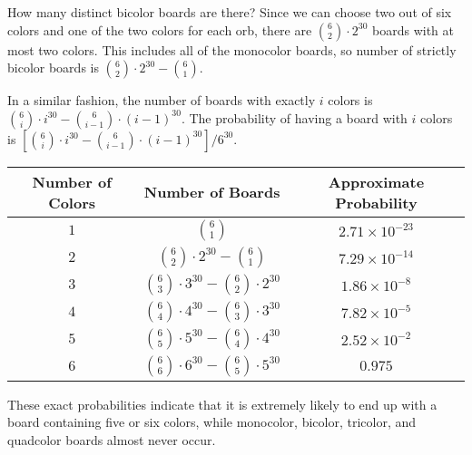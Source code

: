 \documentclass[12pt]{article}
\theoremstyle{definition}
\begin{document}
How many distinct bicolor boards are there? Since we can choose two out of six colors and one of the two colors for each orb, there are $\binom{6}{2}\cdot 2^{30}$ boards with at most two colors. This includes all of the monocolor boards, so number of strictly bicolor boards is $\binom{6}{2}\cdot 2^{30}-\binom{6}{1}$.

In a similar fashion, the number of boards with exactly $i$ colors is $\binom{6}{i}\cdot i^{30}-\binom{6}{i-1}\cdot (i-1)^{30}$. The probability of having a board with $i$ colors is $\left[\binom{6}{i}\cdot i^{30}-\binom{6}{i-1}\cdot (i-1)^{30}\right]/6^{30}$.

\begin{center}
\renewcommand{\arraystretch}{2}
    \begin{tabular}{|c|c|c|}
        \hline
        Number of Colors & Number of Boards & Approximate Probability \\
        \hline\hline
        $1$ & $\binom{6}{1}$ & $%
        2.71\times 10^{-23}$ \\
        \hline
        $2$ & $\binom{6}{2}\cdot 2^{30}-\binom{6}{1}$ & $%
        7.29\times 10^{-14}$ \\
        \hline
        $3$ & $\binom{6}{3}\cdot 3^{30}-\binom{6}{2}\cdot 2^{30}$ & $%
        1.86\times 10^{-8}$ \\
        \hline
        $4$ & $\binom{6}{4}\cdot 4^{30}-\binom{6}{3}\cdot 3^{30}$ & $%
        7.82\times 10^{-5}$ \\
        \hline
        $5$ & $\binom{6}{5}\cdot 5^{30}-\binom{6}{4}\cdot 4^{30}$ & $%
        2.52\times 10^{-2}$ \\
        \hline
        $6$ & $\binom{6}{6}\cdot 6^{30}-\binom{6}{5}\cdot 5^{30}$ & $%
        0.975$ \\
        \hline
    \end{tabular}
\renewcommand{\arraystretch}{2}
\end{center}
These exact probabilities indicate that it is extremely likely to end up with a board containing five or six colors, while monocolor, bicolor, tricolor, and quadcolor boards almost never occur. 
\end{document}
